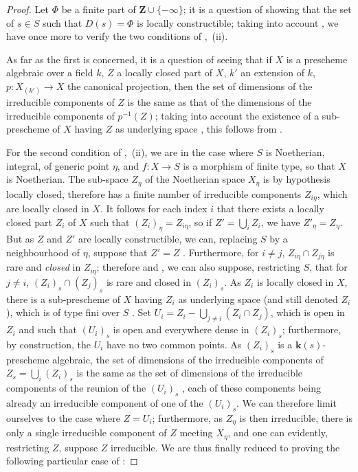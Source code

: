 \begin{proof}
Let $\Phi$ be a finite part of $\mathbf{Z}\cup\{-\infty\}$; it is a question of showing that the set of $s\in S$ such that $D(s)=\Phi$ is locally constructible; taking into account , we have once more to verify the two conditions of ,~(ii).

As far as the first is concerned, it is a question of seeing that if $X$ is a prescheme algebraic over a field $k$, $Z$ a locally closed part of $X$, $k'$ an extension of $k$, $p:X_{(k')}\to X$ the canonical projection, then the set of dimensions of the irreducible components of $Z$ is the same as that of the dimensions of the irreducible components of $p^{-1}(Z)$; taking into account the existence of a sub-prescheme of $X$ having $Z$ as underlying space , this follows from .

For the second condition of ,~(ii), we are in the case where $S$ is Noetherian, integral, of generic point $\eta$, and $f:X\to S$ is a morphism of finite type, so that $X$ is Noetherian.
The sub-space $Z_\eta$ of the Noetherian space $X_\eta$ is by hypothesis locally closed, therefore has a finite number of irreducible components $Z_{i\eta}$, which are locally closed in $X$.
It follows for each index $i$ that there exists a locally closed part $Z_i$ of $X$ such that $(Z_i)_\eta=Z_{i\eta}$, so if $Z'=\bigcup_i Z_i$, we have $Z'_\eta=Z_\eta$.
But as $Z$ and $Z'$ are locally constructible, we can, replacing $S$ by a neighbourhood of $\eta$, suppose that $Z'=Z$ .
Furthermore, for $i\neq j$, $Z_{i\eta}\cap Z_{j\eta}$ is rare and \emph{closed} in $Z_{i\eta}$; therefore  and , we can also suppose, restricting $S$, that for $j\neq i$, $(Z_i)_s\cap(Z_j)_s$ is rare and closed in $(Z_i)_s$.
As $Z_i$ is locally closed in $X$, there is a sub-prescheme of $X$ having $Z_i$ as underlying space (and still denoted $Z_i$), which is of type fini over $S$ .
Set $U_i=Z_i-\bigcup_{j\neq i}(Z_i\cap Z_j)$, which is open in $Z_i$ and such that $(U_i)_s$ is open and everywhere dense in $(Z_i)_s$; furthermore, by construction, the $U_i$ have no two common points.
As $(Z_i)_s$ is a $\boldsymbol{k}(s)$-prescheme algebraic, the set of dimensions of the irreducible components of $Z_s=\bigcup_i(Z_i)_s$ is the same as the set of dimensions of the irreducible components of the reunion of the $(U_i)_s$ , each of these components being already an irreducible component of one of the $(U_i)_s$.
We can therefore limit ourselves to the case where $Z=U_i$; furthermore, as $Z_\eta$ is then irreducible, there is only a single irreducible component of $Z$ meeting $X_\eta$, and one can evidently, restricting $Z$, suppose $Z$ irreducible.
We are thus finally reduced to proving the following particular case of :
\end{proof}

